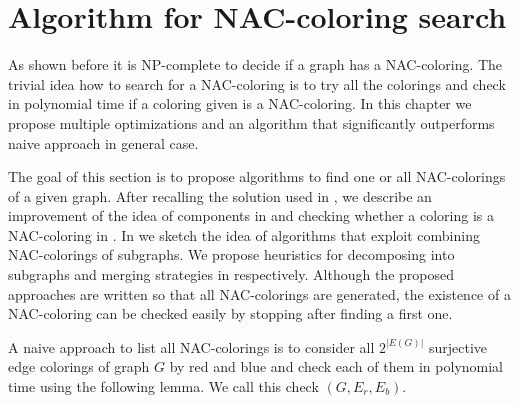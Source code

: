 \chapter{Algorithm for NAC-coloring search}%
\label{chapter:alg}

\begin{chapterabstract}

	As shown before it is NP-complete to decide if a graph has a NAC-coloring.
	The trivial idea how to search for a NAC-coloring is to try all the colorings
	and check in polynomial time if a coloring given is a NAC-coloring.
	In this chapter we propose multiple optimizations
	and an algorithm that significantly outperforms naive approach in general case.

\end{chapterabstract}

The goal of this section is to propose algorithms to find one or all NAC-colorings of a given graph.
After recalling the solution used in \flexrilog{},
we describe an improvement of the idea of \trcon{} components in 
and checking whether a coloring is a NAC-coloring in .
In  we sketch the idea of algorithms that
exploit combining NAC-colorings of subgraphs.
We propose heuristics for decomposing into subgraphs and merging strategies
in  respectively.
Although the proposed approaches are written so that all NAC-colorings are generated,
the existence of a NAC-coloring can be checked easily by stopping after finding a first one.

A naive approach to list all NAC-colorings is to consider
all $2^{|E(G)|}$ surjective edge colorings of graph $G$ by red and blue
and check each of them in polynomial time using the following lemma.
We call this check \IsNACColoring{}$(G, E_r, E_b)$.


